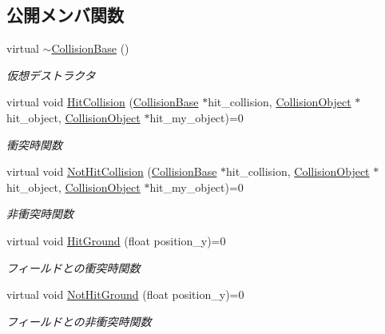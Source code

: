 \subsection*{公開メンバ関数}
\begin{DoxyCompactItemize}
\item 
virtual \mbox{\hyperlink{class_collision_base_a095def3600633e2eb492bf24112e9dc3}{$\sim$\+Collision\+Base}} ()
\begin{DoxyCompactList}\small\item\em 仮想デストラクタ \end{DoxyCompactList}\item 
virtual void \mbox{\hyperlink{class_collision_base_a5c94fe03f875595758e83eb2a176e45d}{Hit\+Collision}} (\mbox{\hyperlink{class_collision_base}{Collision\+Base}} $\ast$hit\+\_\+collision, \mbox{\hyperlink{class_collision_object}{Collision\+Object}} $\ast$hit\+\_\+object, \mbox{\hyperlink{class_collision_object}{Collision\+Object}} $\ast$hit\+\_\+my\+\_\+object)=0
\begin{DoxyCompactList}\small\item\em 衝突時関数 \end{DoxyCompactList}\item 
virtual void \mbox{\hyperlink{class_collision_base_a9b64fc5c3f2aac2a05296985ef799fb1}{Not\+Hit\+Collision}} (\mbox{\hyperlink{class_collision_base}{Collision\+Base}} $\ast$hit\+\_\+collision, \mbox{\hyperlink{class_collision_object}{Collision\+Object}} $\ast$hit\+\_\+object, \mbox{\hyperlink{class_collision_object}{Collision\+Object}} $\ast$hit\+\_\+my\+\_\+object)=0
\begin{DoxyCompactList}\small\item\em 非衝突時関数 \end{DoxyCompactList}\item 
virtual void \mbox{\hyperlink{class_collision_base_a48c9d1d9e4286cde5054d4d2aa70bdd8}{Hit\+Ground}} (float position\+\_\+y)=0
\begin{DoxyCompactList}\small\item\em フィールドとの衝突時関数 \end{DoxyCompactList}\item 
virtual void \mbox{\hyperlink{class_collision_base_ac1ed5b1c0c9b6b70b432e6656f9c4b45}{Not\+Hit\+Ground}} (float position\+\_\+y)=0
\begin{DoxyCompactList}\small\item\em フィールドとの非衝突時関数 \end{DoxyCompactList}\item 

\end{DoxyCompactItemize}
